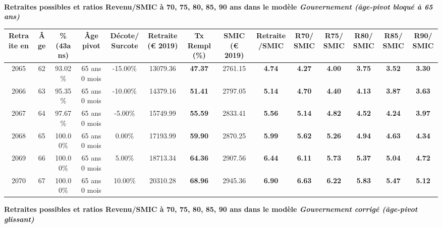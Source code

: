  ~\\{\bf \noindent Retraites possibles et ratios Revenu/SMIC à 70, 75, 80, 85, 90 ans dans le modèle \emph{Gouvernement (âge-pivot bloqué à 65 ans)}}  
 
\begin{adjustbox}{max width=\textwidth} 
\begin{tabular}[htb]{|c|c||c|c|c||c|c||c|c||c|c|c|c|c|} 
\hline 
 Retraite en &  Âge &  \%(43ans) &  Âge pivot &  Décote/Surcote &  Retraite (\euro{} 2019) &  Tx Rempl(\%) &  SMIC (\euro{} 2019) &  Retraite/SMIC &  R70/SMIC &  R75/SMIC &  R80/SMIC &  R85/SMIC &  R90/SMIC \\ 
\hline \hline 
 2065 &  62 &  93.02\% &  65 ans 0 mois &  -15.00\% &  13079.36 &  {\bf 47.37} &  2761.15 &  {\bf 4.74} &  {\bf 4.27} &  {\bf 4.00} &  {\bf 3.75} &  {\bf 3.52} &  {\bf 3.30} \\ 
\hline 
 2066 &  63 &  95.35\% &  65 ans 0 mois &  -10.00\% &  14379.16 &  {\bf 51.41} &  2797.05 &  {\bf 5.14} &  {\bf 4.70} &  {\bf 4.40} &  {\bf 4.13} &  {\bf 3.87} &  {\bf 3.63} \\ 
\hline 
 2067 &  64 &  97.67\% &  65 ans 0 mois &  -5.00\% &  15749.99 &  {\bf 55.59} &  2833.41 &  {\bf 5.56} &  {\bf 5.14} &  {\bf 4.82} &  {\bf 4.52} &  {\bf 4.24} &  {\bf 3.97} \\ 
\hline 
 2068 &  65 &  100.00\% &  65 ans 0 mois &  0.00\% &  17193.99 &  {\bf 59.90} &  2870.25 &  {\bf 5.99} &  {\bf 5.62} &  {\bf 5.26} &  {\bf 4.94} &  {\bf 4.63} &  {\bf 4.34} \\ 
\hline 
 2069 &  66 &  100.00\% &  65 ans 0 mois &  5.00\% &  18713.34 &  {\bf 64.36} &  2907.56 &  {\bf 6.44} &  {\bf 6.11} &  {\bf 5.73} &  {\bf 5.37} &  {\bf 5.04} &  {\bf 4.72} \\ 
\hline 
 2070 &  67 &  100.00\% &  65 ans 0 mois &  10.00\% &  20310.28 &  {\bf 68.96} &  2945.36 &  {\bf 6.90} &  {\bf 6.63} &  {\bf 6.22} &  {\bf 5.83} &  {\bf 5.47} &  {\bf 5.12} \\ 
\hline 
\hline 
\end{tabular} 
\end{adjustbox} 
 
 \vspace{0.1cm} 
{\bf \noindent Retraites possibles et ratios Revenu/SMIC à 70, 75, 80, 85, 90 ans dans le modèle \emph{Gouvernement corrigé (âge-pivot glissant)}}  
 
